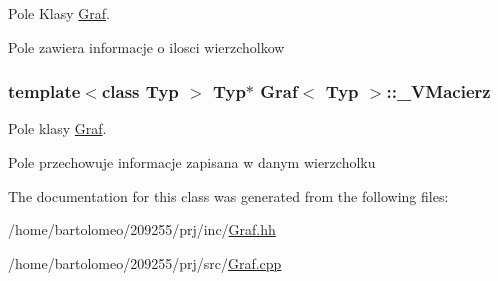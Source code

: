 Pole Klasy \hyperlink{class_graf}{Graf}. 

Pole zawiera informacje o ilosci wierzcholkow \hypertarget{class_graf_a8f8bb580ab7939c3ca50cc759ec33a89}{
\subsubsection[{\-\_\-\-V\-Macierz}]{\setlength{\rightskip}{0pt plus 5cm}template$<$class Typ $>$ Typ$\ast$ {\bf Graf}$<$ Typ $>$\-::\-\_\-\-V\-Macierz\hspace{0.3cm}{\ttfamily [private]}}}\label{class_graf_a8f8bb580ab7939c3ca50cc759ec33a89}


Pole klasy \hyperlink{class_graf}{Graf}. 

Pole przechowuje informacje zapisana w danym wierzcholku 

The documentation for this class was generated from the following files\-:\begin{DoxyCompactItemize}
\item 
/home/bartolomeo/209255/prj/inc/\hyperlink{_graf_8hh}{Graf.\-hh}\item 
/home/bartolomeo/209255/prj/src/\hyperlink{_graf_8cpp}{Graf.\-cpp}\end{DoxyCompactItemize}
